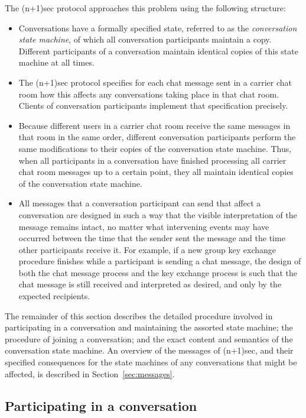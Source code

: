 \documentclass{article}
\begin{document}
The (n+1)sec protocol approaches this problem using the following structure:
\begin{itemize}
\item Conversations have a formally specified state, referred to as the \emph{conversation state machine}, of which all conversation participants maintain a copy. Different participants of a conversation maintain identical copies of this state machine at all times.
\item The (n+1)sec protocol specifies for each chat message sent in a carrier chat room how this affects any conversations taking place in that chat room. Clients of conversation participants implement that specification precisely.
\item Because different users in a carrier chat room receive the same messages in that room in the same order, different conversation participants perform the same modifications to their copies of the conversation state machine. Thus, when all participants in a conversation have finished processing all carrier chat room messages up to a certain point, they all maintain identical copies of the conversation state machine.
\item All messages that a conversation participant can send that affect a conversation are designed in such a way that the visible interpretation of the message remains intact, no matter what intervening events may have occurred between the time that the sender sent the message and the time other participants receive it. For example, if a new group key exchange procedure finishes while a participant is sending a chat message, the design of both the chat message process and the key exchange process is such that the chat message is still received and interpreted as desired, and only by the expected recipients.
\end{itemize}

The remainder of this section describes the detailed procedure involved in participating in a conversation and maintaining the assorted state machine; the procedure of joining a conversation; and the exact content and semantics of the conversation state machine.
An overview of the messages of (n+1)sec, and their specified consequences for the state machines of any conversations that might be affected, is described in Section~\ref{sec:messages}.


\subsection{Participating in a conversation}
\label{sec:conversation-state-machine/participating}
\end{document}
